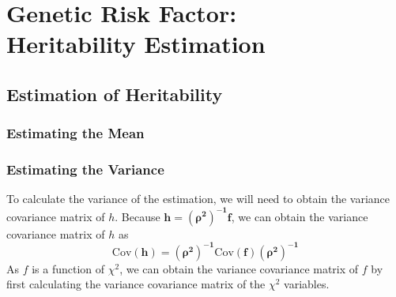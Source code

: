 \documentclass{book}
\begin{document}
	\chapter[Genetic Risk Factor - Heritability Estimation]{Genetic Risk Factor:\\Heritability Estimation}
		\section{Estimation of Heritability}
			\subsection{Estimating the Mean}
			\subsection{Estimating the Variance}
			To calculate the variance of the estimation, we will need to obtain the variance covariance matrix of $h$. 
			Because $\boldsymbol{h}=\boldsymbol{(\rho^2)^{-1}f}$, we can obtain the variance covariance matrix of $h$ as
			$$
			\boldsymbol{\mathrm{Cov}(h)} = \boldsymbol{(\rho^2)^{-1}\mathrm{Cov}(f)(\rho^2)^{-1}}
			$$
			As $f$ is a function of $\chi^2$, we can obtain the variance covariance matrix of $f$ by first calculating the variance covariance matrix of the $\chi^2$ variables.
			
\end{document}
